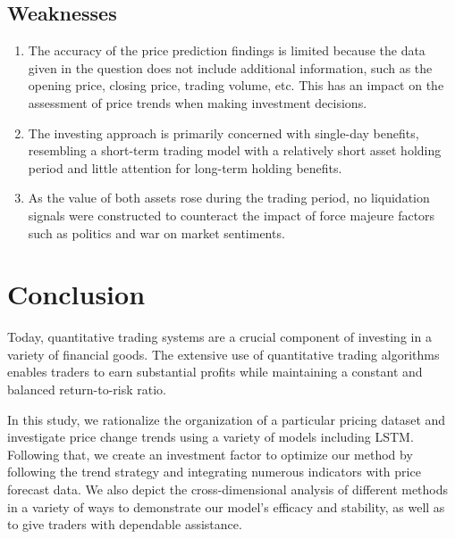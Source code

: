 \documentclass{mcmthesis}
\begin{document}
\subsection{Weaknesses}
\begin{enumerate}
	\item The accuracy of the price prediction findings is limited because the data given in the question does not include additional information, such as the opening price, closing price, trading volume, etc. This has an impact on the assessment of price trends when making investment decisions.
	\item The investing approach is primarily concerned with single-day benefits, resembling a short-term trading model with a relatively short asset holding period and little attention for long-term holding benefits.
	\item As the value of both assets rose during the trading period, no liquidation signals were constructed to counteract the impact of force majeure factors such as politics and war on market sentiments.
\end{enumerate}

\section{Conclusion}
Today, quantitative trading systems are a crucial component of investing in a variety of financial goods. The extensive use of quantitative trading algorithms enables traders to earn substantial profits while maintaining a constant and balanced return-to-risk ratio.

In this study, we rationalize the organization of a particular pricing dataset and investigate price change trends using a variety of models including LSTM. Following that, we create an investment factor to optimize our method by following the trend strategy and integrating numerous indicators with price forecast data. We also depict the cross-dimensional analysis of different methods in a variety of ways to demonstrate our model’s efficacy and stability, as well as to give traders with dependable assistance.
\end{document}
